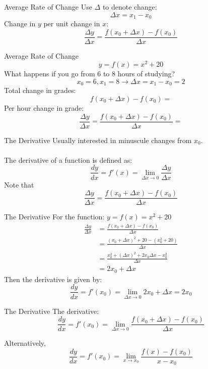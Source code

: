 \documentclass{./../../Latex/teaching_slides}
\begin{document}
\begin{frame}{Average Rate of Change}
Use $\Delta$ to denote change:
$$\Delta x=x_{1}-x_{0}$$
Change in $y$ per unit change in $x$:
$$ \frac{\Delta y}{\Delta x}=\frac{f\left(x_{0}+\Delta x\right)-f\left(x_{0}\right)}{\Delta x} $$
\end{frame}

\begin{frame}{Average Rate of Change}
\vspace{-1em}
$$y=f(x)=x^{2}+20$$ 
What happens if you go from 6 to 8 hours of studying? 
$$ x_0 = 6, x_1 = 8 \rightarrow   \Delta x = x_{1}-x_{0}=2 $$
Total change in grades:
$$ f(x_0+\Delta x) - f(x_0) =    $$ 
Per hour change in grade:
$$ \frac{\Delta y}{\Delta x}=\frac{f\left(x_{0}+\Delta x\right)-f\left(x_{0}\right)}{\Delta x} = $$
\end{frame}

\begin{frame}{The Derivative}
Usually interested in minuscule changes from $x_0$. \\~\\
The derivative of a function is defined as:
$$ \frac{d y}{d x} = f'(x)= \lim_{\Delta x \rightarrow 0} \frac{\Delta y}{\Delta x} $$
\vspace{1em}
Note that $$ \frac{\Delta y}{\Delta x}=\frac{f\left(x_{0}+\Delta x\right)-f\left(x_{0}\right)}{\Delta x}  $$
\end{frame}

\begin{frame}{The Derivative}
For the function: $y=f(x)=x^{2}+20$
\begin{align*} \frac{\Delta y}{\Delta x}&=\frac{f\left(x_{0}+\Delta x\right)-f\left(x_{0}\right)}{\Delta x} \\
&= \frac{(x_0+\Delta x)^2+20-(x_0^2+20)}{\Delta x} \\
&= \frac{x_0^2+ (\Delta x)^2+2 x_0 \Delta x-x_0^2}{\Delta x} \\&= 2 x_0 + \Delta x
\end{align*} 
Then the derivative is given by: 
$$ \frac{d y}{d x} = f'(x_0)= \lim_{\Delta x \rightarrow 0} 2 x_0 + \Delta x = 2 x_0 $$
\end{frame}

\begin{frame}{The Derivative}
The derivative:
$$ \frac{d y}{d x} = f'(x_0)= \lim_{\Delta x \rightarrow 0} \frac{f\left(x_{0}+\Delta x\right)-f\left(x_{0}\right)}{\Delta x} $$
\vspace{1em}

Alternatively, 
$$ \frac{d y}{d x} = f'(x_0)= \lim_{ x \rightarrow x_0} \frac{f(x)-f(x_{0})}{x-x_0}  $$
\end{frame}
\end{document}
